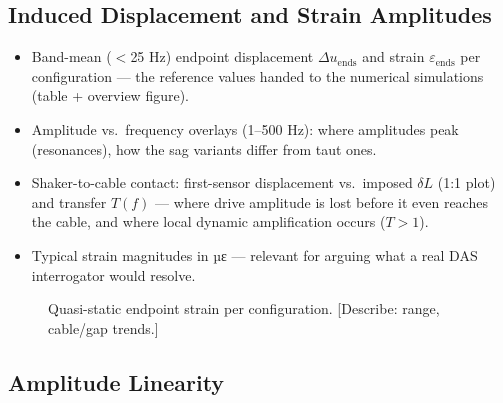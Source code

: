 \subsection{Induced Displacement and Strain Amplitudes}
\label{sec:res:amplitudes}

\begin{itemize}
  \item Band-mean ($<$25 Hz) endpoint displacement $\Delta u_\mathrm{ends}$
    and strain $\varepsilon_\mathrm{ends}$ per configuration — the reference
    values handed to the numerical simulations (table + overview figure).
  \item Amplitude vs.\ frequency overlays (1–500 Hz): where amplitudes peak
    (resonances), how the sag variants differ from taut ones.
  \item Shaker-to-cable contact: first-sensor displacement vs.\ imposed
    $\delta L$ (1:1 plot) and transfer $T(f)$ — where drive amplitude is
    lost before it even reaches the cable, and where local dynamic
    amplification occurs ($T>1$).
  \item Typical strain magnitudes in µε — relevant for arguing what a real
    DAS interrogator would resolve.
\end{itemize}

\begin{figure}[htb]
  \centering
  \caption{Quasi-static endpoint strain per configuration. [Describe: range,
    cable/gap trends.]}
  \label{fig:res:amplitudes}
\end{figure}


\subsection{Amplitude Linearity}
\label{sec:res:linearity}

